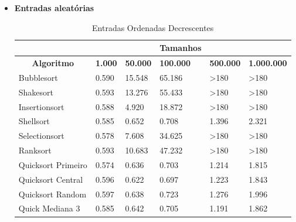 \documentclass{article}
\begin{document}
\begin{flushleft}
\begin{itemize}
\item \textbf{Entradas aleatórias} \\

\begin{table}[ht]
\centering
\caption{Entradas Ordenadas Decrescentes}
\label{my-label}

\begin{tabular}{l|lllll|}

\cline{2-6}
                                                  &                &           &    \textbf{Tamanhos}& &         \\ \hline
\multicolumn{1}{|c|}{\textbf{Algoritmo}} & \textbf{1.000} & \textbf{50.000} & \textbf{100.000} & \textbf{500.000} & \textbf{1.000.000} \\ \hline
\multicolumn{1}{|l|}{Bubblesort}         & 0.590          & 15.548          & 65.186           & \textgreater180  & \textgreater180    \\ \hline
\multicolumn{1}{|l|}{Shakesort}          & 0.593          & 13.276          & 55.433           & \textgreater180  & \textgreater180    \\ \hline
\multicolumn{1}{|l|}{Insertionsort}      & 0.588          & 4.920           & 18.872           & \textgreater180  & \textgreater180    \\ \hline
\multicolumn{1}{|l|}{Shellsort}          & 0.585          & 0.652           & 0.708            & 1.396            & 2.321              \\ \hline
\multicolumn{1}{|l|}{Selectionsort}      & 0.578          & 7.608           & 34.625           & \textgreater180  & \textgreater180    \\ \hline
\multicolumn{1}{|l|}{Ranksort}           & 0.593          & 10.683          & 47.232           & \textgreater180  & \textgreater180    \\ \hline
\multicolumn{1}{|l|}{Quicksort Primeiro} & 0.574          & 0.636           & 0.703            & 1.214            & 1.815              \\ \hline
\multicolumn{1}{|l|}{Quicksort Central}  & 0.596          & 0.622           & 0.697            & 1.223            & 1.843              \\ \hline
\multicolumn{1}{|l|}{Quicksort Random}   & 0.597          & 0.638           & 0.723            & 1.276            & 1.996              \\ \hline
\multicolumn{1}{|l|}{Quick Mediana 3}    & 0.585          & 0.642           & 0.705            & 1.191            & 1.862              \\ \hline

\end{tabular}
\end{table}
\end{itemize}
\end{flushleft}
\end{document}
